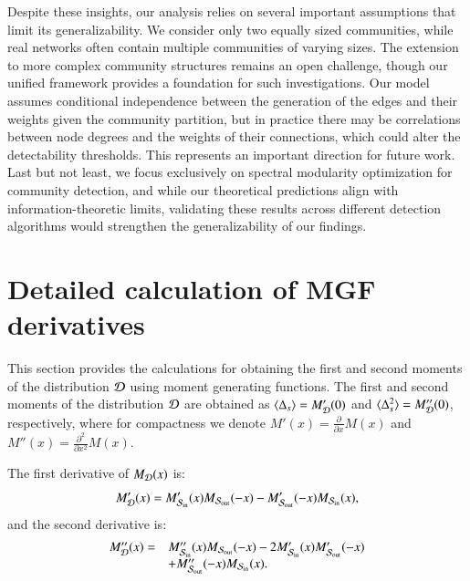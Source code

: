 \documentclass[a4paper,pre,superscriptaddress,floatfix,nofootinbib,twocolumn]{revtex4-1}
\begin{document}
Despite these insights, our analysis relies on several important assumptions that limit its generalizability. We consider only two equally sized communities, while real networks often contain multiple communities of varying sizes. The extension to more complex community structures remains an open challenge, though our unified framework provides a foundation for such investigations. Our model assumes %
conditional independence between the generation of the edges and their weights given the community partition,
but in practice there may be correlations between node degrees and the weights of their connections, which could alter the detectability thresholds. This represents an important direction for future work. Last but not least, we focus exclusively on spectral modularity optimization for community detection, and while our theoretical predictions align with information-theoretic limits, validating these results across different detection algorithms would strengthen the generalizability of our findings.





\appendix


\section{Detailed calculation of MGF derivatives}
\label{sec:moment_calculations}

This section provides the calculations for obtaining the first and second moments of the distribution ${\cal D}$ using moment generating functions.
The first and second moments of the distribution ${\cal D}$ are obtained as $\langle \Delta_{s} \rangle = M'_{\cal D}(0)$ and $\langle \Delta_{s}^2 \rangle = M''_{\cal D}(0)$, respectively, where for compactness we denote $M'(x) = \frac{\partial}{\partial x} M(x)$ and $M''(x) = \frac{\partial^2}{\partial x^2} M(x)$.

The first derivative of $M_{\cal D}(x)$ is:
\[
M'_{\cal D}(x) = M'_{{\cal S}_\text{in}}(x) M_{{\cal S}_\text{out}}(-x) - M'_{{\cal S}_\text{out}}(-x) M_{{\cal S}_\text{in}}(x),
\]
and the second derivative is:
\[
\begin{array}{ll}
M''_{\cal D}(x) = & M''_{{\cal S}_\text{in}}(x) M_{{\cal S}_\text{out}}(-x) - 2 M'_{{\cal S}_\text{in}}(x) M'_{{\cal S}_\text{out}}(-x) \\
& + M''_{{\cal S}_\text{out}}(-x) M_{{\cal S}_\text{in}}(x).
\end{array}
\]
\end{document}
